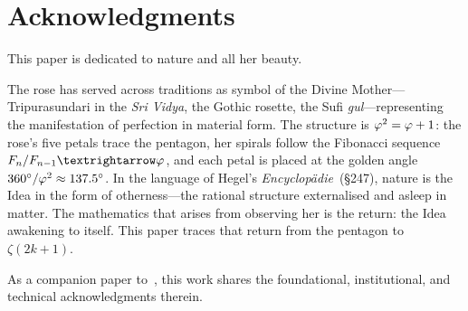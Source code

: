 \section*{Acknowledgments}

This paper is dedicated to nature and all her beauty.

The rose has served across traditions as symbol of the
Divine Mother---Tripurasundari in the \textit{Sri Vidya},
the Gothic rosette, the Sufi \textit{gul}---representing the
manifestation of perfection in material form.
The structure is $\varphi^2 = \varphi + 1$: the rose's five
petals trace the pentagon, her spirals follow the Fibonacci
sequence $F_n/F_{n-1} \to \golden$, and each petal is placed at
the golden angle $360^\circ/\varphi^2 \approx 137.5^\circ$.
In the language of Hegel's \textit{Encyclop\"adie}~(\S247),
nature is the Idea in the form of otherness---the rational
structure externalised and asleep in matter.  The mathematics
that arises from observing her is the return: the Idea
awakening to itself.  This paper traces that return from the
pentagon to $\zeta(2k+1)$.

As a companion paper to~\cite{gonzalez25hp}, this work shares the
foundational, institutional, and technical acknowledgments
therein.

